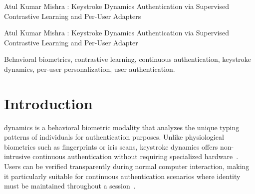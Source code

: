 \documentclass{ieeeaccess}
\begin{document}
\markboth
{Atul Kumar Mishra \headeretal: Keystroke Dynamics Authentication via Supervised Contrastive Learning and Per-User Adapters}
{Atul Kumar Mishra \headeretal: Keystroke Dynamics Authentication via Supervised Contrastive Learning and Per-User Adapter



\begin{abstract}
We propose a two-stage framework for keystroke dynamics authentication that combines supervised contrastive pretraining with per-user adapter fine-tuning. In the first stage, a global 1D Convolutional Neural Network (CNN) encoder is trained using Supervised Contrastive Loss (SupCon) on the CMU Keystroke Dynamics Benchmark, learning generalizable keystroke embeddings that achieve an Area Under the Curve (AUC) of 0.90 for cross-user verification on unseen users. In the second stage, after user enrollment, a lightweight Multi-Layer Perceptron (MLP) adapter with approximately 16,000 parameters is trained on the user's enrollment samples to personalize the embedding space. This per-user adapter reduces the Equal Error Rate (EER) from 3.3\% (encoder-only with centroid matching) to 2.6\% for enrolled users. Our key insight is that per-user adapters serve a fundamentally different role than the global encoder: adapters are personalization modules effective only after enrollment, not generalization mechanisms designed for cross-user transfer. This separation enables both fast enrollment requiring only 5--10 keystroke samples and strong verification performance for continuous authentication scenarios. To the best of our knowledge, this is the first application of supervised contrastive learning to keystroke dynamics and the first two-stage framework explicitly separating generalization from personalization in behavioral biometrics.
\end{abstract}

\begin{keywords}
Behavioral biometrics, contrastive learning, continuous authentication, keystroke dynamics, per-user personalization, user authentication.
\end{keywords}

\titlepgskip=-15pt

\maketitle

\section{Introduction}
\label{sec:introduction}
 dynamics is a behavioral biometric modality that analyzes the unique typing patterns of individuals for authentication purposes. Unlike physiological biometrics such as fingerprints or iris scans, keystroke dynamics offers non-intrusive continuous authentication without requiring specialized hardware~\cite{b1,b2}. Users can be verified transparently during normal computer interaction, making it particularly suitable for continuous authentication scenarios where identity must be maintained throughout a session~\cite{b3}.

}
\end{document}
